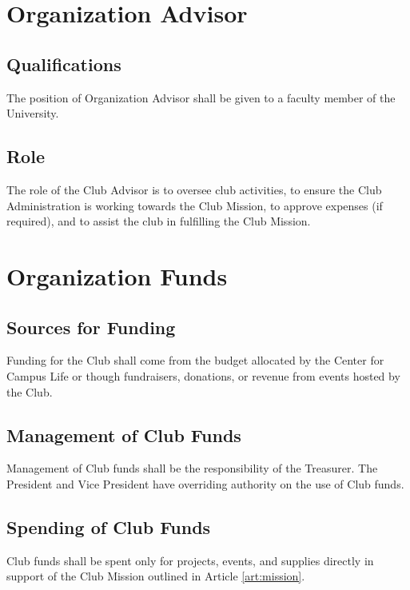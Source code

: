 \documentclass[english,11pt]{article}
\begin{document}
\section{Organization Advisor} \label{art:advisor}

\subsection{Qualifications} \label{sect:advisor:qualifications}
The position of Organization Advisor shall be given to a faculty member of the University.

\subsection{Role} \label{sect:advisor:role}
The role of the Club Advisor is to oversee club activities, to ensure the Club Administration is working towards the Club Mission, to approve expenses (if required), and to assist the club in fulfilling the Club Mission.

\section{Organization Funds} \label{art:funds}

\subsection{Sources for Funding} \label{sect:funds:sources}
Funding for the Club shall come from the budget allocated by the Center for Campus Life or though fundraisers, donations, or revenue from events hosted by the Club.

\subsection{Management of Club Funds} \label{sect:funds:management}
Management of Club funds shall be the responsibility of the Treasurer.
The President and Vice President have overriding authority on the use of Club funds.

\subsection{Spending of Club Funds} \label{sect:funds:spending}
Club funds shall be spent only for projects, events, and supplies directly in support of the Club Mission outlined in Article \ref{art:mission}.
\end{document}
